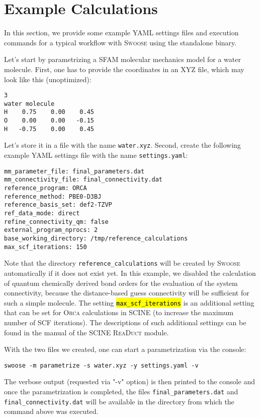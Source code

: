 \documentclass[]{tufte-book}
\begin{document}
{{\chapter{Example Calculations}\label{ch:example_calculations}

In this section, we provide some example YAML settings files and execution commands for a typical workflow with \textsc{Swoose} using the standalone binary.

Let's start by parametrizing a SFAM molecular mechanics model for a water molecule. First, one has to provide the coordinates in an XYZ file, which may look like this (unoptimized):
\begin{mdframed}[backgroundcolor=LightSteelBlue!25, linewidth=0pt]
\begin{verbatim}
3
water molecule
H    0.75    0.00    0.45
O    0.00    0.00   -0.15
H   -0.75    0.00    0.45
\end{verbatim}
\end{mdframed}
Let's store it in a file with the name \texttt{water.xyz}. Second, create the following example YAML settings file with the name \texttt{settings.yaml}:
\begin{mdframed}[backgroundcolor=LightSteelBlue!25, linewidth=0pt]
\begin{verbatim}
mm_parameter_file: final_parameters.dat
mm_connectivity_file: final_connectivity.dat
reference_program: ORCA
reference_method: PBE0-D3BJ
reference_basis_set: def2-TZVP
ref_data_mode: direct
refine_connectivity_qm: false
external_program_nprocs: 2
base_working_directory: /tmp/reference_calculations
max_scf_iterations: 150
\end{verbatim}
\end{mdframed}
Note that the directory \texttt{reference\_calculations} will be created by \textsc{Swoose} automatically if it does not exist yet. In this example, we disabled the calculation of quantum chemically derived bond orders for the evaluation of the system connectivity, because the distance-based guess connectivity will be sufficient for such a simple molecule. The setting \hl{\texttt{max\_scf\_iterations}} is an additional setting that can be set for \textsc{Orca} calculations in SCINE (to increase the maximum number of SCF iterations). The descriptions of such additional settings can be found in the manual of the SCINE \textsc{ReaDuct} module\cite{readuct}.

With the two files we created, one can start a parametrization via the console:
\begin{mdframed}[backgroundcolor=LightSteelBlue!25, linewidth=0pt]
\begin{verbatim}
swoose -m parametrize -s water.xyz -y settings.yaml -v
\end{verbatim}
\end{mdframed}
The verbose output (requested via "-v" option) is then printed to the console and once the parametrization is completed, the files \texttt{final\_parameters.dat} and \texttt{final\_connectivity.dat} will be available in the directory from which the command above was executed.

}}
\end{document}
